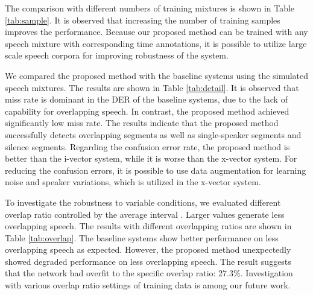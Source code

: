 \documentclass[a4paper]{article}
\begin{document}
The comparison with different numbers of training mixtures is shown in Table \ref{tab:sample}.
It is observed that increasing the number of training samples improves the performance.
Because our proposed method can be trained with any speech mixture with corresponding time annotations, it is possible to utilize large scale speech corpora for improving robustness of the system.

We compared the proposed method with the baseline systems using the simulated speech mixtures.
The results are shown in Table \ref{tab:detail}.
It is observed that miss rate is dominant in the DER of the baseline systems, due to the lack of capability for overlapping speech.
In contrast, the proposed method achieved significantly low miss rate.
The results indicate that the proposed method successfully detects overlapping segments as well as single-speaker segments and silence segments. 
Regarding the confusion error rate, the proposed method is better than the i-vector system, while it is worse than the x-vector system.
For reducing the confusion errors, it is possible to use data augmentation for learning noise and speaker variations, which is utilized in the x-vector system.

To investigate the robustness to variable conditions, we evaluated different overlap ratio controlled by the average interval . Larger  values generate less overlapping speech.
The results with different overlapping ratios are shown in Table \ref{tab:overlap}.
The baseline systems show better performance on less overlapping speech as expected.
However, the proposed method unexpectedly showed degraded performance on less overlapping speech.
The result suggests that the network had overfit to the specific overlap ratio: 27.3\%.
Investigation with various overlap ratio settings of training data is among our future work.
\end{document}
